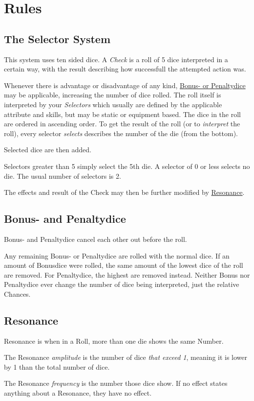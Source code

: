 \chapter{Rules}\label{ch:rules}
\section{The Selector System}\label{sec:selectorsystem}
This system uses ten sided dice.
A \emph{Check} is a roll of 5 dice interpreted in a certain way,
with the result describing how successfull the attempted action was.\par
Whenever there is advantage or disadvantage of any kind,
\hyperref[sec:bonus--and-penaltydice]{Bonus- or Penaltydice} may be applicable,
increasing the number of dice rolled.
The roll itself is interpreted by your \emph{Selectors} which usually are defined
by the applicable attribute and skills, but may be static or equipment based.
The dice in the roll are ordered in ascending order.
To get the result of the roll (or to \emph{interpret} the roll), every selector \emph{selects} describes
the number of the die (from the bottom).

Selected dice are then added.

Selectors greater than 5 simply select the 5th die.
A selector of 0 or less selects no die.
The usual number of selectors is 2.\par
The effects and result of the Check may then be further modified by \hyperref[sec:resonance]{Resonance}.

\section{Bonus- and Penaltydice}\label{sec:bonus--and-penaltydice}
Bonus- and Penaltydice cancel each other out before the roll.\par
Any remaining Bonus- or Penaltydice are rolled with the normal dice.
If an amount of Bonusdice were rolled,
the same amount of the lowest dice of the roll are removed.
For Penaltydice, the highest are removed instead.
Neither Bonus nor Penaltydice ever change the number of dice being interpreted, just the relative Chances.

\section{Resonance}\label{sec:resonance}
Resonance is when in a Roll, more than one die shows the same Number.\par
The Resonance \emph{amplitude} is the number of dice \emph{that exceed 1}, meaning it is lower by 1 than the total
number of dice.\par
The Resonance \emph{frequency} is the number those dice show.
If no effect states anything about a Resonance, they have no effect.

